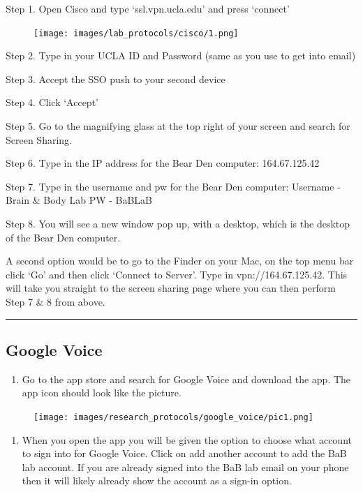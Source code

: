\documentclass[
]{book}
\providecommand{\tightlist}{%
  \setlength{\itemsep}{0pt}\setlength{\parskip}{0pt}}
\begin{document}
Step 1. Open Cisco and type `ssl.vpn.ucla.edu' and press `connect'

\begin{figure}
\centering
\texttt{[image: images/lab\_protocols/cisco/1.png]}
\caption{}
\end{figure}

Step 2. Type in your UCLA ID and Password (same as you use to get into email)

Step 3. Accept the SSO push to your second device

Step 4. Click `Accept'

Step 5. Go to the magnifying glass at the top right of your screen and search for Screen Sharing.

Step 6. Type in the IP address for the Bear Den computer: 164.67.125.42

Step 7. Type in the username and pw for the Bear Den computer:
Username - Brain \& Body Lab
PW - BaBLaB

Step 8. You will see a new window pop up, with a desktop, which is the desktop of the Bear Den computer.

A second option would be to go to the Finder on your Mac, on the top menu bar click `Go' and then click `Connect to Server'. Type in vpn://164.67.125.42. This will take you straight to the screen sharing page where you can then perform Step 7 \& 8 from above.

\begin{center}\rule{0.5\linewidth}{0.5pt}\end{center}

\hypertarget{google-voice}{%
\subsection{Google Voice}\label{google-voice}}

\begin{enumerate}
\def\labelenumi{\arabic{enumi})}
\tightlist
\item
  Go to the app store and search for Google Voice and download the app. The app icon should look like the picture.
\end{enumerate}

\begin{figure}
\centering
\texttt{[image: images/research\_protocols/google\_voice/pic1.png]}
\caption{}
\end{figure}

\begin{enumerate}
\def\labelenumi{\arabic{enumi})}
\setcounter{enumi}{1}
\tightlist
\item
  When you open the app you will be given the option to choose what account to sign into for Google Voice. Click on add another account to add the BaB lab account. If you are already signed into the BaB lab email on your phone then it will likely already show the account as a sign-in option.
\end{enumerate}
\end{document}
